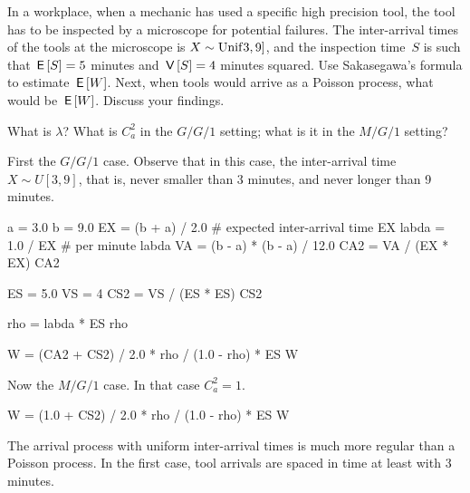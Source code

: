 \documentclass[stochastic-or.tex]{subfiles}
\begin{document}
\begin{exercise}\label{ex:91}
In a workplace, when a mechanic has used a specific high precision tool, the tool has to be inspected by a microscope for potential failures.
The inter-arrival times of the tools at the microscope is $X\sim \mathrm{Unif}3, 9]$, and the inspection time~$S$ is such that $\,\mathsf{E}\left[S\right] = 5$ minutes and $\,\mathsf{V}\left[S\right] = 4$ minutes squared.
Use Sakasegawa's formula to estimate $\,\mathsf{E}\left[W\right]$.
Next, when tools would arrive as a Poisson process, what would be $\,\mathsf{E}\left[W\right]$.
Discuss your findings.
\begin{hint}
  What is $\lambda$? What is $C_a^2$ in the $G/G/1$ setting; what is it in the $M/G/1$ setting?
\end{hint}

\begin{solution}
First the $G/G/1$ case. Observe that in this case, the inter-arrival time $X\sim U[3,9]$, that is, never smaller than 3 minutes, and never longer than 9 minutes.

\begin{pyconsole}
a = 3.0
b = 9.0
EX = (b + a) / 2.0  # expected inter-arrival time
EX
labda = 1.0 / EX  # per minute
labda
VA = (b - a) * (b - a) / 12.0
CA2 = VA / (EX * EX)
CA2

ES = 5.0
VS = 4
CS2 = VS / (ES * ES)
CS2

rho = labda * ES
rho

W = (CA2 + CS2) / 2.0 * rho / (1.0 - rho) * ES
W
\end{pyconsole}

Now the $M/G/1$ case. In that case $C_a^2=1$.
\begin{pyconsole}
W = (1.0 + CS2) / 2.0 * rho / (1.0 - rho) * ES
W
\end{pyconsole}

The arrival process with uniform inter-arrival times is much more regular than a Poisson process.
In the first case, tool arrivals are spaced in time at least with 3 minutes.
\end{solution}
\end{exercise}


\end{document}
